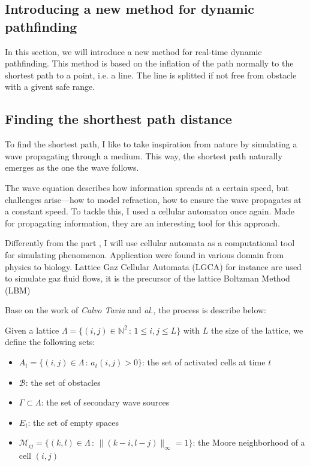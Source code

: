\documentclass[../main.tex]{subfiles}
\begin{document}
\subsection{Introducing a new method for dynamic pathfinding}

In this section, we will introduce a new method for real-time dynamic pathfinding. This method is based on the inflation of the path normally to the shortest path to a point, i.e. a line. The line is splitted if not free from obstacle with a givent safe range. 



\subsection{Finding the shorthest path distance}
To find the shortest path, I like to take inspiration from nature by simulating a wave propagating through a medium. This way, the shortest path naturally emerges as the one the wave follows.  

\vspace{1em}

The wave equation describes how information spreads at a certain speed, but challenges arise—how to model refraction, how to ensure the wave propagates at a constant speed. To tackle this, I used a cellular automaton once again. Made for propagating information, they are an interesting tool for this approach.\cite{tapia_2016}

\vspace{1em}

Differently from the part \figtonum, I will use cellular automata as a computational tool for simulating phenomenon. Application were found in various domain from physics to biology. Lattice Gaz Cellular Automata (LGCA) for instance are used to simulate gaz fluid flows, it is the precursor of the lattice Boltzman Method (LBM)\cite{chen_1998}

\vspace{1em}

Base on the work of \textit{Calvo Tavia} and \textit{al.}\cite{tapia_2016}, the process is describe below:

\vspace{1em}

Given a lattice $\Lambda = \{(i,j) \in \mathbb{N}^{2} \,:\, 1 \leq i, j \leq L\}$ with $L$ the size of the lattice, we define the following sets:
\vspace{1em}

\begin{itemize}
	\item $A_t = \{ (i, j) \in \Lambda \,:\, a_t(i, j) > 0\}$: the set of activated cells at time $t$
	\item $\mathcal{B}$: the set of obstacles
	\item $\Gamma \subset \Lambda$: the set of secondary wave sources
	\item $E_t$: the set of empty spaces
	\item $\mathcal{M}_{ij} = \{ (k, l) \in \Lambda \,:\, \|(k - i, l - j)\|_{\infty} = 1\}$: the Moore neighborhood of a cell $(i, j)$
\end{itemize}
\end{document}
